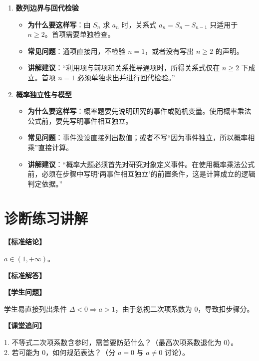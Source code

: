 \documentclass[11pt,a4paper]{ctexart}
\newcommand{\teachblock}[2]{%
  \par\addvspace{0.55em}%
  \noindent\textbf{【#1】}\par\nobreak
  \begingroup
    \raggedright
    \setlength{\parskip}{0.35em}%
    #2\par
  \endgroup
}
\newcommand{\topicteacherproblem}[2]{%
  \teachquestionheader{#1\quad #2}
}
\begin{document}
{\begin{enumerate}[label=\arabic*. , leftmargin=2em, itemsep=0.3em]
      \begin{itemize}[leftmargin=1.5em, itemsep=0.1em]
        \item \textbf{为什么要这样写}：解析几何的中间步骤较多，设点设线、联立、判别式、韦达、代入目标式都可能给分。
        \item \textbf{常见问题}：忽视斜率不存在的情形；在韦达定理前不写判别式 \(\Delta > 0\)。
        \item \textbf{讲解建议}：“解析几何的步骤分比较集中。把‘设点设线、联立消元、判别式与韦达定理’写完整，能减少因过程缺失造成的失分。”
      \end{itemize}
    \item \textbf{数列边界与回代检验}
      \begin{itemize}[leftmargin=1.5em, itemsep=0.1em]
        \item \textbf{为什么要这样写}：由 \(S_n\) 求 \(a_n\) 时，关系式 \(a_n = S_n - S_{n-1}\) 只适用于 \(n \ge 2\)。首项需要单独检查。
        \item \textbf{常见问题}：通项直接用，不检验 \(n=1\)，或者没有写出 \(n \ge 2\) 的声明。
        \item \textbf{讲解建议}：“利用项与前项和关系推导通项时，所得关系式仅在 \(n \ge 2\) 下成立。首项 \(n=1\) 必须单独求出并进行回代检验。”
      \end{itemize}
    \item \textbf{概率独立性与模型}
      \begin{itemize}[leftmargin=1.5em, itemsep=0.1em]
        \item \textbf{为什么要这样写}：概率题要先说明研究的事件或随机变量。使用概率乘法公式前，要先写明事件相互独立。
        \item \textbf{常见问题}：事件没设直接列出数值；或者不写“因为事件独立，所以概率相乘”直接计算。
        \item \textbf{讲解建议}：“概率大题必须首先对研究对象定义事件。在使用概率乘法公式前，必须在步骤中写明‘两事件相互独立’的前置条件，这是计算成立的逻辑判定依据。”
      \end{itemize}
  \end{enumerate}
}

\newpage

\section{诊断练习讲解}

\topicteacherproblem{检测 1}{代数分类讨论与退化边界}
{\small \qGeneralCheckOneStem}

\begin{paracol}{2}
\teachblock{标准结论}{
  \(a \in (1, +\infty)\)。
}
\teachblock{标准解答}{
  \qGeneralCheckOneSolution
}

\switchcolumn
\teachblock{学生问题}{
  学生易直接列出条件 \(\Delta < 0 \Rightarrow a > 1\)，由于忽视二次项系数为 0，导致扣步骤分。
}
\teachblock{课堂追问}{
  1. 不等式二次项系数含参时，需首要防范什么？（最高次项系数退化为 0）。\\
  2. 若可能为 0，如何规范表达？（分 \(a = 0\) 与 \(a \neq 0\) 讨论）。
}
\end{paracol}
\end{document}
